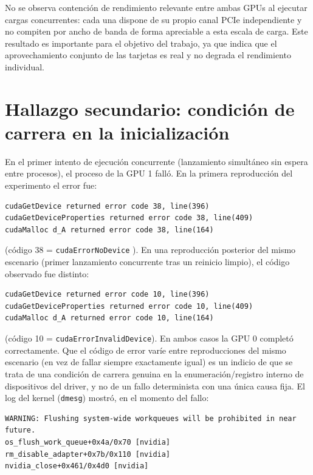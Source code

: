 No se observa contención de rendimiento relevante entre ambas GPUs al ejecutar cargas concurrentes: cada una dispone de su propio canal PCIe independiente y no compiten por ancho de banda de forma apreciable a esta escala de carga. Este resultado es importante para el objetivo del trabajo, ya que indica que el aprovechamiento conjunto de las tarjetas es real y no degrada el rendimiento individual.

\section{Hallazgo secundario: condición de carrera en la inicialización} \label{sec:race}

En el primer intento de ejecución concurrente (lanzamiento simultáneo sin espera entre procesos), el proceso de la GPU 1 falló. En la primera reproducción del experimento el error fue:

\begin{lstlisting}[style=bash]
cudaGetDevice returned error code 38, line(396)
cudaGetDeviceProperties returned error code 38, line(409)
cudaMalloc d_A returned error code 38, line(164)
\end{lstlisting}

(código 38 = \texttt{cudaErrorNoDevice} \cite{nvidia_cuda_programming}). En una reproducción posterior del mismo escenario (primer lanzamiento concurrente tras un reinicio limpio), el código observado fue distinto:

\begin{lstlisting}[style=bash]
cudaGetDevice returned error code 10, line(396)
cudaGetDeviceProperties returned error code 10, line(409)
cudaMalloc d_A returned error code 10, line(164)
\end{lstlisting}

(código 10 = \texttt{cudaErrorInvalidDevice}). En ambos casos la GPU 0 completó correctamente. Que el código de error varíe entre reproducciones del mismo escenario (en vez de fallar siempre exactamente igual) es un indicio de que se trata de una condición de carrera genuina en la enumeración/registro interno de dispositivos del driver, y no de un fallo determinista con una única causa fija. El log del kernel (\texttt{dmesg}) mostró, en el momento del fallo:

\begin{lstlisting}[style=bash]
WARNING: Flushing system-wide workqueues will be prohibited in near future.
os_flush_work_queue+0x4a/0x70 [nvidia]
rm_disable_adapter+0x7b/0x110 [nvidia]
nvidia_close+0x461/0x4d0 [nvidia]
\end{lstlisting}

